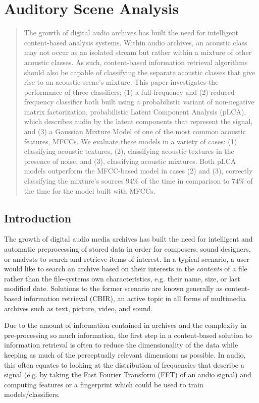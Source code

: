\chapter{Auditory Scene Analysis}
\minitoc

\begin{abstract}
The growth of digital audio archives has built the need for intelligent content-based analysis systems.  Within audio archives, an acoustic class may not occur as an isolated stream but rather within a mixture of other acoustic classes.  As such, content-based information retrieval algorithms should also be capable of classifying the separate acoustic classes that give rise to an acoustic scene's mixture.  This paper investigates the performance of three classifiers; (1) a full-frequency and (2) reduced frequency classifier both built using a probabilistic variant of non-negative matrix factorization, probabilistic Latent Component Analysis (pLCA), which describes audio by the latent components that represent the signal, and (3) a Gaussian Mixture Model of one of the most common acoustic features, MFCCs.  We evaluate these models in a variety of cases: (1) classifying acoustic textures, (2), classifying acoustic textures in the presence of noise, and (3), classifying acoustic mixtures.  Both pLCA models outperform the MFCC-based model in cases (2) and (3), correctly classifying the mixture's sources 94\% of the time in comparison to 74\% of the time for the model built with MFCCs.
\end{abstract}

\section{Introduction}

The growth of digital audio media archives has built the need for intelligent and automatic preprocessing of stored data in order for composers, sound designers, or analysts to search and retrieve items of interest.  In a typical scenario, a user would like to search an archive based on their interests in the \textit{contents} of a file rather than the file-systems own characteristics, e.g. their name, size, or last modified date.  Solutions to the former scenario are known generally as content-based information retrieval (CBIR), an active topic in all forms of multimedia archives such as text, picture, video, and sound. 

Due to the amount of information contained in archives and the complexity in pre-processing so much information, the first step in a content-based solution to information retrieval is often to reduce the dimensionality of the data while keeping as much of the perceptually relevant dimensions as possible.  In audio, this often equates to looking at the distribution of frequencies that describe a signal (e.g. by taking the Fast Fourier Transform (FFT) of an audio signal) and computing features or a fingerprint which could be used to train models/classifiers.

